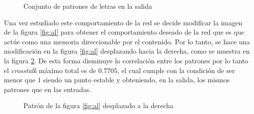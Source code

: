 \documentclass{sig-alternate}
\begin{document}
	\begin{figure}[h]
		\begin{center}
			\hspace{20pt}
			\hspace{20pt}
		\end{center}
	\caption{Conjunto de patrones de letras en la salida}
	\label{fig:outputLetras}
	\end{figure}

Una vez estudiado este comportamiento de la red se decide modificar la imagen de la figura \ref{fig:al} para obtener el comportamiento deseado de la red que es que actúe como una memoria direccionable por el contenido. Por lo tanto, se hace una modificación en la figura \ref{fig:al} desplazando hacia la derecha, como se muestra en la figura \ref{fig:a_desplazada}. De esta forma disminuye la correlación entre los patrones por lo tanto el \textit{crosstalk} máximo total es de $0.7705$, el cual cumple con la condición de ser menor que $1$ siendo un punto estable y obteniendo, en la salida, los mismos patrones que en las entradas.

	\begin{figure}[h]
         \begin{center}
         \end{center}
         \caption{Patr\'on de la figura \ref{fig:al} desplazado a la derecha}
         \label{fig:a_desplazada}
	\end{figure}
\end{document}
